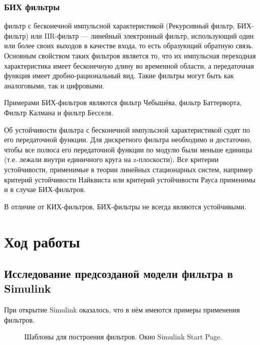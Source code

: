 \documentclass[a4paper,14pt]{extarticle}
\begin{document}
\subsubsection{БИХ фильтры}
фильтр с бесконечной импульсной характеристикой (Рекурсивный фильтр, БИХ-фильтр) или IIR-фильтр — линейный электронный фильтр, использующий один или более своих выходов в качестве входа, то есть образующий обратную связь. Основным свойством таких фильтров является то, что их импульсная переходная характеристика имеет бесконечную длину во временной области, а передаточная функция имеет дробно-рациональный вид. Такие фильтры могут быть как аналоговыми, так и цифровыми.

Примерами БИХ-фильтров являются фильтр Чебышёва, фильтр Баттерворта, Фильтр Калмана и фильтр Бесселя.

Об устойчивости фильтра с бесконечной импульсной характеристикой судят по его передаточной функции. Для дискретного фильтра необходимо и достаточно, чтобы все полюса его передаточной функции по модулю были меньше единицы (т.е. лежали внутри единичного круга на z-плоскости). Все критерии устойчивости, применимые в теории линейных стационарных систем, например критерий устойчивости Найквиста или критерий устойчивости Рауса применимы и в случае БИХ-фильтров.

В отличие от КИХ-фильтров, БИХ-фильтры не всегда являются устойчивыми.

\section{Ход работы}

\subsection{Исследование предсозданой модели фильтра в Simulink}

При открытие Simulink оказалось, что в нём имеются примеры применения фильтров.

\begin{figure}[H]
\caption{Шаблоны для построения фильтров. Окно Simulink Start Page.}
\label{000}
\end{figure}
\end{document}
